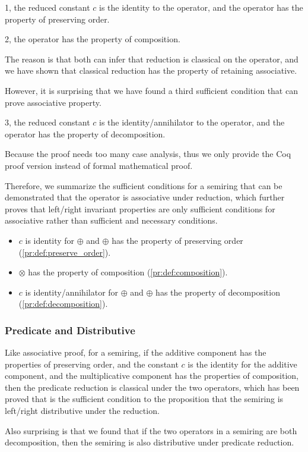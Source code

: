 \documentclass[a4paper,12pt,twoside,openright]{report}
\begin{document}
1, the reduced constant $c$ is the identity to the operator, and the operator has the property of preserving order.

2, the operator has the property of composition.

The reason is that both can infer that reduction is classical on the operator, and we have shown that classical reduction has the property of retaining associative.

However, it is surprising that we have found a third sufficient condition that can prove associative property.

3, the reduced constant $c$ is the identity/annihilator to the operator, and the operator has the property of decomposition.

Because the proof needs too many case analysis, thus we only provide the Coq proof version instead of formal mathematical proof.

Therefore, we summarize the sufficient conditions for a semiring that can be demonstrated that the operator is associative under reduction, which further proves that left/right invariant properties are only sufficient conditions for associative rather than sufficient and necessary conditions.
\begin{itemize}
  \item $c$ is identity for $\oplus$ and $\oplus$ has the property of preserving order (\ref{pr:def:preserve_order}).
  \item $\otimes$ has the property of composition (\ref{pr:def:composition}).
  \item $c$ is identity/annihilator for $\oplus$ and $\oplus$ has the property of decomposition (\ref{pr:def:decomposition}).
\end{itemize}
\subsubsection{Predicate and Distributive}
Like associative proof, for a semiring,  if the additive component has the properties of preserving order, and the constant $c$ is the identity for the additive component, and the multiplicative component has the properties of composition, then the predicate reduction is classical under the two operators, which has been proved that is the sufficient condition to the proposition that the semiring is left/right distributive under the reduction.

Also surprising is that we found that if the two operators in a semiring are both decomposition, then the semiring is also distributive under predicate reduction.
\end{document}
